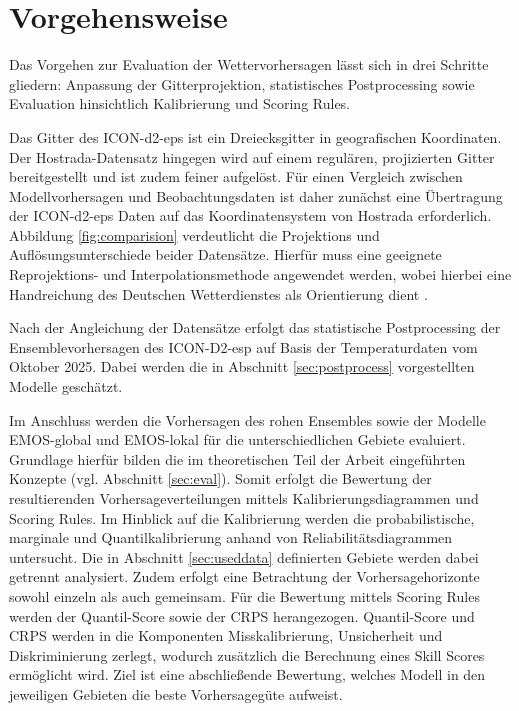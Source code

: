 \documentclass{article}
\numberwithin{equation}{section}
\begin{document}
\section{Vorgehensweise}
Das Vorgehen zur Evaluation der Wettervorhersagen lässt sich in drei Schritte gliedern: Anpassung der Gitterprojektion, statistisches Postprocessing sowie Evaluation hinsichtlich Kalibrierung und Scoring Rules.

Das Gitter des ICON-d2-eps ist ein Dreiecksgitter in geografischen Koordinaten. Der Hostrada-Datensatz hingegen wird auf einem regulären, projizierten Gitter bereitgestellt und ist zudem feiner aufgelöst. Für einen Vergleich zwischen Modellvorhersagen und Beobachtungsdaten ist daher zunächst eine Übertragung der ICON-d2-eps Daten auf das Koordinatensystem von Hostrada erforderlich. Abbildung \ref{fig:comparision} verdeutlicht die Projektions und Auflösungsunterschiede beider Datensätze. Hierfür muss eine geeignete Reprojektions- und Interpolationsmethode angewendet werden, wobei hierbei eine Handreichung des Deutschen Wetterdienstes als Orientierung dient \textcite{umwandlung}. 

Nach der Angleichung der Datensätze erfolgt das statistische Postprocessing der Ensemblevorhersagen des ICON-D2-esp auf Basis der Temperaturdaten vom Oktober 2025. Dabei werden die in Abschnitt \ref{sec:postprocess} vorgestellten Modelle geschätzt.

Im Anschluss werden die Vorhersagen des rohen Ensembles sowie der Modelle EMOS-global und EMOS-lokal für die unterschiedlichen Gebiete evaluiert. Grundlage hierfür bilden die im theoretischen Teil der Arbeit eingeführten Konzepte (vgl. Abschnitt \ref{sec:eval}). Somit erfolgt die Bewertung der resultierenden Vorhersageverteilungen mittels Kalibrierungsdiagrammen und Scoring Rules. Im Hinblick auf die Kalibrierung werden die probabilistische, marginale und Quantilkalibrierung anhand von Reliabilitätsdiagrammen untersucht. Die in Abschnitt \ref{sec:useddata} definierten Gebiete werden dabei getrennt analysiert. Zudem erfolgt eine Betrachtung der Vorhersagehorizonte sowohl einzeln als auch gemeinsam. Für die Bewertung mittels Scoring Rules werden der Quantil-Score sowie der CRPS herangezogen. Quantil-Score und CRPS werden in die Komponenten Misskalibrierung, Unsicherheit und Diskriminierung zerlegt, wodurch zusätzlich die Berechnung eines Skill Scores ermöglicht wird. Ziel ist eine abschließende Bewertung, welches Modell in den jeweiligen Gebieten die beste Vorhersagegüte aufweist.
\end{document}
